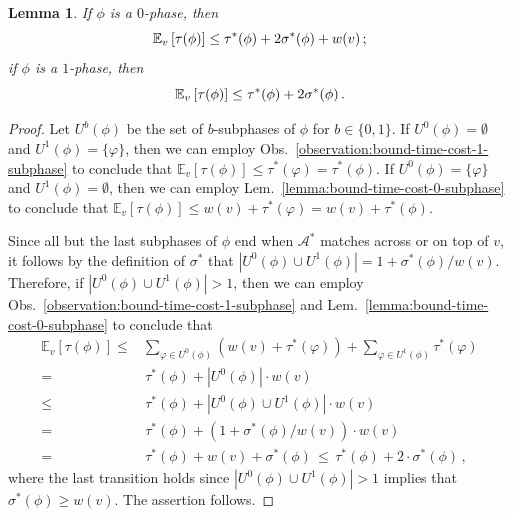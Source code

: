 \documentclass[11pt]{article}
\def\LongVersion{}
\def\LongVersionEnd{}
\newtheorem{lemma}[theorem]{Lemma}
\theoremstyle{definition}
\theoremstyle{plain}
\newtheorem{lemma}[theorem]{Lemma}
\theoremstyle{definition}
\theoremstyle{plain}
\newtheorem{lemma}{Lemma}[section]
\theoremstyle{definition}
\theoremstyle{plain}
\newenvironment{MathMaybe}[0]
{\begin{displaymath}\ignorespaces}
{\end{displaymath}\ignorespacesafterend}
\newenvironment{MathMaybe}[0]
{\begin{math}\ignorespaces}
{\end{math}}
\newcommand{\Lem}{Lem.}
\newcommand{\Obs}{Obs.}
\newcommand{\Expect}{\mathbb{E}}
\newcommand{\A}{\mathcal{A}}
\newcommand{\adv}[1]{{#1}^{*}}
\begin{document}
\begin{lemma} \label{lemma:0-and-1-phases}
If $\phi$ is a $0$-phase, then
\begin{MathMaybe}
\Expect_{v} \left[ \tau(\phi) \right]
\leq
\adv{\tau}(\phi) + 2 \adv{\sigma}(\phi) + w(v) \, ;
\end{MathMaybe}
if $\phi$ is a $1$-phase, then
\begin{MathMaybe}
\Expect_{v} \left[ \tau(\phi) \right]
\leq
\adv{\tau}(\phi) + 2 \adv{\sigma}(\phi) \, .
\end{MathMaybe}
\end{lemma}
%
\LongVersion %
\begin{proof}
Let
$U^{b}(\phi)$
be the set of $b$-subphases of $\phi$ for $b \in \{ 0, 1 \}$.
If
$U^{0}(\phi) = \emptyset$
and
$U^{1}(\phi) = \{ \varphi \}$,
then we can employ \Obs{}~\ref{observation:bound-time-cost-1-subphase} to
conclude that
$\Expect_{v}[\tau(\phi)]
\leq
\adv{\tau}(\varphi)
=
\adv{\tau}(\phi)$.
If
$U^{0}(\phi) = \{ \varphi \}$
and
$U^{1}(\phi) = \emptyset$,
then we can employ \Lem{}~\ref{lemma:bound-time-cost-0-subphase} to conclude
that
$\Expect_{v}[\tau(\phi)]
\leq
w(v) + \adv{\tau}(\varphi)
=
w(v) + \adv{\tau}(\phi)$.

Since all but the last subphases of $\phi$ end when $\adv{\A}$ matches across
or on top of $v$, it follows by the definition of $\adv{\sigma}$ that
$|U^{0}(\phi) \cup U^{1}(\phi)| = 1 + \adv{\sigma}(\phi) / w(v)$.
Therefore, if
$|U^{0}(\phi) \cup U^{1}(\phi)| > 1$,
then we can employ \Obs{}~\ref{observation:bound-time-cost-1-subphase} and
\Lem{}~\ref{lemma:bound-time-cost-0-subphase} to conclude that
\begin{align*}
\Expect_{v} \left[ \tau(\phi) \right]
\leq &
\sum_{\varphi \in U^{0}(\phi)} \left( w(v) + \adv{\tau}(\varphi) \right)
+
\sum_{\varphi \in U^{1}(\phi)} \adv{\tau}(\varphi) \\
= & \,
\adv{\tau}(\phi) + |U^{0}(\phi)| \cdot w(v) \\
\leq & \,
\adv{\tau}(\phi) + |U^{0}(\phi) \cup U^{1}(\phi)| \cdot w(v) \\
= & \,
\adv{\tau}(\phi)
+
\left( 1 + \adv{\sigma}(\phi) / w(v) \right) \cdot w(v) \\
= & \,
\adv{\tau}(\phi) + w(v) + \adv{\sigma}(\phi)
\, \leq \,
\adv{\tau}(\phi) + 2 \cdot \adv{\sigma}(\phi) \, ,
\end{align*}
where the last transition holds since
$|U^{0}(\phi) \cup U^{1}(\phi)| > 1$
implies that
$\adv{\sigma}(\phi) \geq w(v)$.
The assertion follows.
\end{proof}
\LongVersionEnd %
\end{document}
